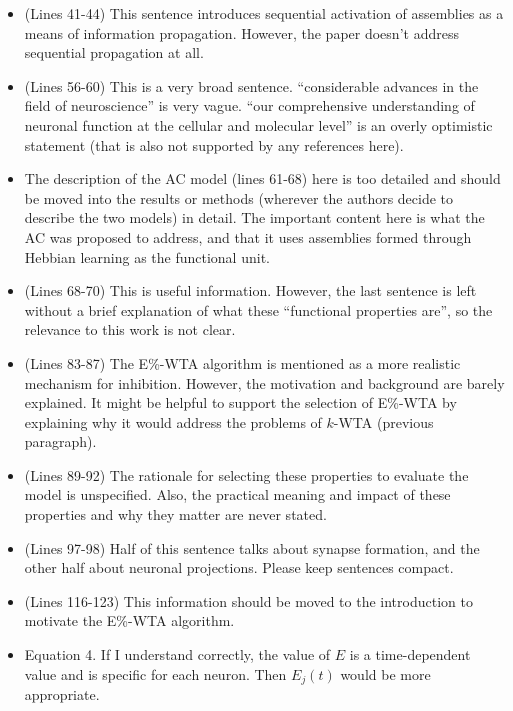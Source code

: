 \documentclass[a4paper, 11pt]{article}
\begin{document}
\begin{itemize}
    \item (Lines 41-44) This sentence introduces sequential activation of assemblies as a means of information propagation. However, the paper doesn't address sequential propagation at all.
    
    \item (Lines 56-60) This is a very broad sentence. ``considerable advances in the field of neuroscience'' is very vague. ``our comprehensive understanding of neuronal function at the cellular and molecular level'' is an overly optimistic statement (that is also not supported by any references here).
    
    \item The description of the AC model (lines 61-68) here is too detailed and should be moved into the results or methods (wherever the authors decide to describe the two models) in detail. The important content here is what the AC was proposed to address, and that it uses assemblies formed through Hebbian learning as the functional unit.
    
    \item (Lines 68-70) This is useful information. However, the last sentence is left without a brief explanation of what these ``functional properties are'', so the relevance to this work is not clear.
    
    \item (Lines 83-87) The E\%-WTA algorithm is mentioned as a more realistic mechanism for inhibition. However, the motivation and background are barely explained. It might be helpful to support the selection of E\%-WTA by explaining why it would address the problems of $k$-WTA (previous paragraph).
    
    \item (Lines 89-92) The rationale for selecting these properties to evaluate the model is unspecified. Also, the practical meaning and impact of these properties and why they matter are never stated.
    
    \item (Lines 97-98) Half of this sentence talks about synapse formation, and the other half about neuronal projections. Please keep sentences compact.
    
    \item (Lines 116-123) This information should be moved to the introduction to motivate the E\%-WTA algorithm.
    
    \item Equation 4. If I understand correctly, the value of $E$ is a time-dependent value and is specific for each neuron. Then $E_j(t)$ would be more appropriate.
    

\end{itemize}
\end{document}
